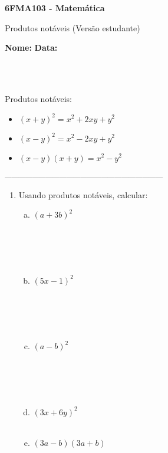 \documentclass[a4paper,14pt]{article}
\begin{document}
	
	\noindent\textbf{6FMA103 - Matemática} 
	
	\begin{center}Produtos notáveis (Versão estudante)
	\end{center}
	
	\noindent\textbf{Nome:} \underline{\hspace{10cm}}
	\noindent\textbf{Data:} \underline{\hspace{4cm}}
	
	~ \\ ~
	\begin{multicols}{2}
		\noindent Produtos notáveis:
		\begin{itemize}
			\item $(x + y)^2 = x^2 + 2xy + y^2$
			\item $(x - y)^2 = x^2 - 2xy + y^2$
			\item $(x - y)(x + y) = x^2 - y^2$
		\end{itemize}
		\textsubscript{---------------------------------------------------------------------}
    	\begin{enumerate}
    		\item Usando produtos notáveis, calcular:
    		\begin{enumerate}[a)]
    			\item $(a + 3b)^2$ \\\\\\\\\\
    			\item $(5x - 1)^2$ \\\\\\\\\\
    			\item $(a - b)^2$ \\\\\\\\\\
    			\item $(3x + 6y)^2$ \\\\
    			\item $(3a - b)(3a + b)$ \\\\\\\\\\

\end{enumerate}
\end{enumerate}
\end{multicols}
\end{document}
